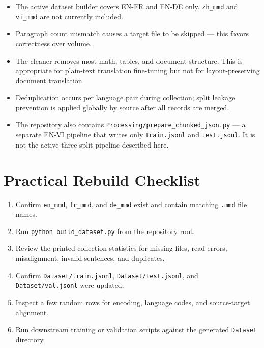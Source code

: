 \documentclass[12pt,a4paper]{article}
\begin{document}
\begin{itemize}
  \item The active dataset builder covers EN-FR and EN-DE only. \texttt{zh\_mmd} and \texttt{vi\_mmd} are not currently included.
  \item Paragraph count mismatch causes a target file to be skipped — this favors correctness over volume.
  \item The cleaner removes most math, tables, and document structure. This is appropriate for plain-text translation fine-tuning but not for layout-preserving document translation.
  \item Deduplication occurs per language pair during collection; split leakage prevention is applied globally by source after all records are merged.
  \item The repository also contains \texttt{Processing/prepare\_chunked\_json.py} — a separate EN-VI pipeline that writes only \texttt{train.jsonl} and \texttt{test.jsonl}. It is not the active three-split pipeline described here.
\end{itemize}

\section{Practical Rebuild Checklist}

\begin{enumerate}
  \item Confirm \texttt{en\_mmd}, \texttt{fr\_mmd}, and \texttt{de\_mmd} exist and contain matching \texttt{.mmd} file names.
  \item Run \texttt{python build\_dataset.py} from the repository root.
  \item Review the printed collection statistics for missing files, read errors, misalignment, invalid sentences, and duplicates.
  \item Confirm \texttt{Dataset/train.jsonl}, \texttt{Dataset/test.jsonl}, and \texttt{Dataset/val.jsonl} were updated.
  \item Inspect a few random rows for encoding, language codes, and source-target alignment.
  \item Run downstream training or validation scripts against the generated \texttt{Dataset} directory.
\end{enumerate}

\end{document}
